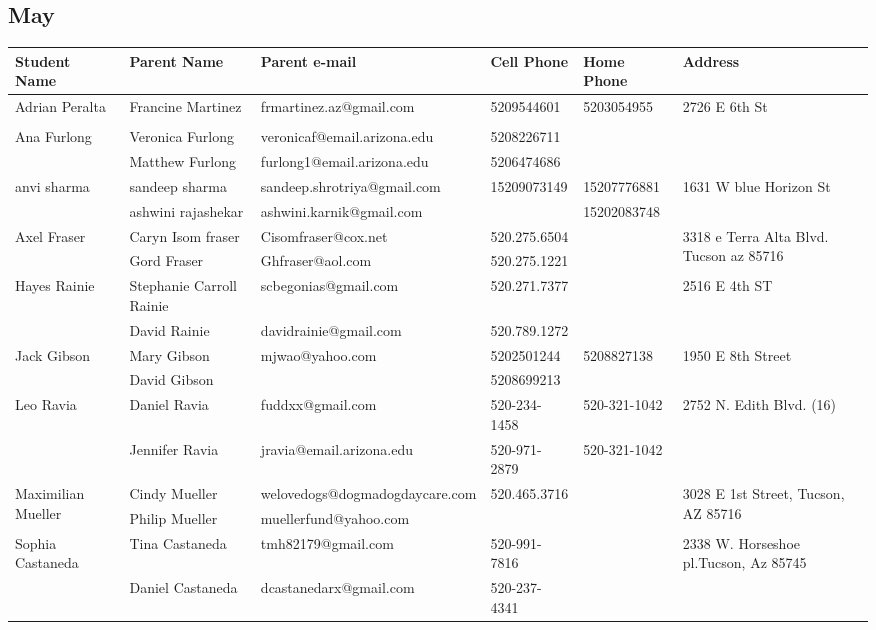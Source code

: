 \documentclass[landscape]{article}\usepackage[]{graphicx}\usepackage[]{color}
\begin{document}
\subsection{May}
\begin{longtable}{|p{100pt}|p{100pt}|p{140pt}|p{60pt}|p{64pt}|p{120pt}|}
\textbf{Student Name} & \textbf{Parent Name} & \textbf{Parent e-mail} & \textbf{Cell Phone} & \textbf{Home Phone} & \textbf{Address}\\
\hline
\hline
\multirow{2}{100pt}{Adrian Peralta} & Francine Martinez & frmartinez.az@gmail.com & 5209544601 & 5203054955 & \multirow{2}{120pt}{2726 E 6th St} \\
 &  &  &  &  & \\
\hline
\multirow{2}{100pt}{Ana Furlong} & Veronica Furlong & veronicaf@email.arizona.edu & 5208226711 &  & \multirow{2}{120pt}{} \\
 & Matthew Furlong & furlong1@email.arizona.edu & 5206474686 &  & \\
\hline
\multirow{2}{100pt}{anvi sharma} & sandeep sharma & sandeep.shrotriya@gmail.com & 15209073149 & 15207776881 & \multirow{2}{120pt}{1631 W blue Horizon St} \\
 & ashwini rajashekar & ashwini.karnik@gmail.com &  & 15202083748 & \\
\hline
\multirow{2}{100pt}{Axel Fraser } & Caryn Isom fraser & Cisomfraser@cox.net & 520.275.6504 &  & \multirow{2}{120pt}{3318 e Terra Alta Blvd. Tucson az 85716 } \\
 & Gord Fraser  & Ghfraser@aol.com & 520.275.1221 &  & \\
\hline
\multirow{2}{100pt}{Hayes Rainie} & Stephanie Carroll Rainie & scbegonias@gmail.com & 520.271.7377 &  & \multirow{2}{120pt}{2516 E 4th ST} \\
 & David Rainie & davidrainie@gmail.com & 520.789.1272 &  & \\
\hline
\multirow{2}{100pt}{Jack Gibson} & Mary Gibson & mjwao@yahoo.com & 5202501244 & 5208827138 & \multirow{2}{120pt}{1950 E 8th Street} \\
 & David Gibson &  & 5208699213 &  & \\
\hline
\multirow{2}{100pt}{Leo Ravia} & Daniel Ravia & fuddxx@gmail.com & 520-234-1458 & 520-321-1042 & \multirow{2}{120pt}{2752 N. Edith Blvd. (16)} \\
 & Jennifer Ravia & jravia@email.arizona.edu & 520-971-2879 & 520-321-1042 & \\
\hline
\multirow{2}{100pt}{Maximilian Mueller} & Cindy Mueller & welovedogs@dogmadogdaycare.com & 520.465.3716 &  & \multirow{2}{120pt}{3028 E 1st Street, Tucson, AZ 85716} \\
 & Philip Mueller & muellerfund@yahoo.com &  &  & \\
\hline
\multirow{2}{100pt}{Sophia Castaneda} & Tina Castaneda & tmh82179@gmail.com & 520-991-7816 &  & \multirow{2}{120pt}{2338 W. Horseshoe pl.Tucson, Az 85745} \\
 & Daniel Castaneda & dcastanedarx@gmail.com & 520-237-4341 &  & \\
\hline
\end{longtable}
\newpage
\end{document}
